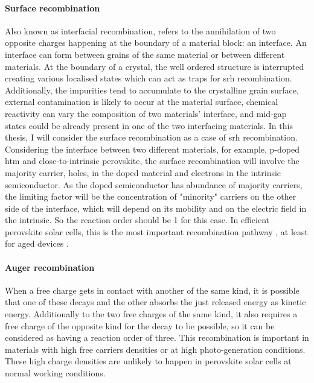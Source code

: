 		\paragraph{Surface recombination}\label{intro_surface_recombination}
		Also known as interfacial recombination, refers to the annihilation of two opposite charges happening at the boundary of a material block: an interface.
		An interface can form between grains of the same material or between different materials.
		At the boundary of a crystal, the well ordered structure is interrupted creating various localised states which can act as traps for \gls{srh} recombination.
		Additionally, the impurities tend to accumulate to the crystalline grain surface, external contamination is likely to occur at the material surface, chemical reactivity can vary the composition of two materials' interface, and mid-gap states could be already present in one of the two interfacing materials.
		In this thesis, I will consider the surface recombination as a case of \gls{srh} recombination.
		Considering the interface between two different materials, for example, p-doped \gls{htm} and close-to-intrinsic perovskite, the surface recombination will involve the majority carrier, holes, in the doped material and electrons in the intrinsic semiconductor.
		As the doped semiconductor has abundance of majority carriers, the limiting factor will be the concentration of "minority" carriers on the other side of the interface, which will depend on its mobility and on the electric field in the intrinsic.
		So the reaction order should be 1 for this case.
		In efficient perovskite solar cells, this is the most important recombination pathway \cite{Calado2019,Carnie2015,Stolterfoht2018a}, at least for aged devices \cite{Tress2018,Correa-Baena2017a}.

		\paragraph{Auger recombination}
		When a free charge gets in contact with another of the same kind, it is possible that one of these decays and the other absorbs the just released energy as kinetic energy.
		Additionally to the two free charges of the same kind, it also requires a free charge of the opposite kind for the decay to be possible, so it can be considered as having a reaction order of three.
		This recombination is important in materials with high free carriers densities or at high photo-generation conditions.
		These high charge densities are unlikely to happen in perovskite solar cells at normal working conditions.

